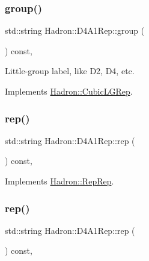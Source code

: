 \subsubsection{\texorpdfstring{group()}{group()}\hspace{0.1cm}{\footnotesize\ttfamily [3/3]}}
{\footnotesize\ttfamily std\+::string Hadron\+::\+D4\+A1\+Rep\+::group (\begin{DoxyParamCaption}{ }\end{DoxyParamCaption}) const\hspace{0.3cm}{\ttfamily [inline]}, {\ttfamily [virtual]}}

Little-\/group label, like D2, D4, etc. 

Implements \mbox{\hyperlink{structHadron_1_1CubicLGRep_a9bdb14b519a611d21379ed96a3a9eb41}{Hadron\+::\+Cubic\+L\+G\+Rep}}.

\mbox{\label{structHadron_1_1D4A1Rep_a935e95f3ad80b6499e276424e3573730}} 
\subsubsection{\texorpdfstring{rep()}{rep()}\hspace{0.1cm}{\footnotesize\ttfamily [1/3]}}
{\footnotesize\ttfamily std\+::string Hadron\+::\+D4\+A1\+Rep\+::rep (\begin{DoxyParamCaption}{ }\end{DoxyParamCaption}) const\hspace{0.3cm}{\ttfamily [inline]}, {\ttfamily [virtual]}}



Implements \mbox{\hyperlink{structHadron_1_1RepRep_ab3213025f6de249f7095892109575fde}{Hadron\+::\+Rep\+Rep}}.

\mbox{\label{structHadron_1_1D4A1Rep_a935e95f3ad80b6499e276424e3573730}} 
\subsubsection{\texorpdfstring{rep()}{rep()}\hspace{0.1cm}{\footnotesize\ttfamily [2/3]}}
{\footnotesize\ttfamily std\+::string Hadron\+::\+D4\+A1\+Rep\+::rep (\begin{DoxyParamCaption}{ }\end{DoxyParamCaption}) const\hspace{0.3cm}{\ttfamily [inline]}, {\ttfamily [virtual]}}



